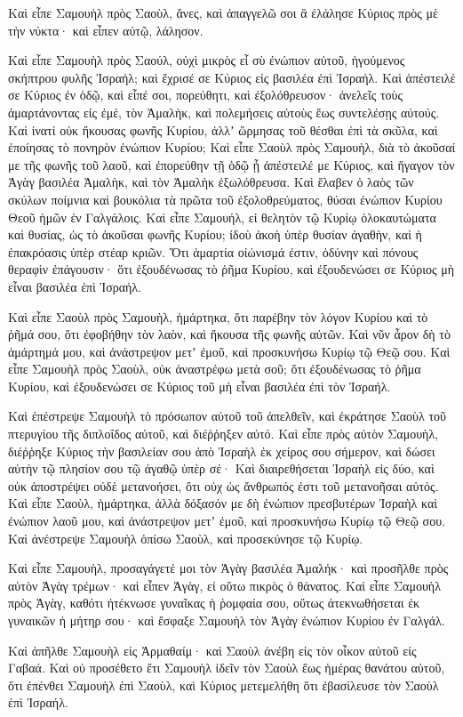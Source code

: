 {Καὶ εἶπε Σαμουὴλ πρὸς Σαοὺλ, ἄνες, καὶ ἀπαγγελῶ σοι ἃ ἐλάλησε Κύριος πρὸς μὲ τὴν νύκτα· καὶ εἶπεν αὐτῷ, λάλησον.
\par }{\PP {}Καὶ εἶπε Σαμουὴλ πρὸς Σαούλ, οὐχὶ μικρὸς εἶ σὺ ἐνώπιον αὐτοῦ, ἡγούμενος σκήπτρου φυλῆς Ἰσραήλ; καὶ ἔχρισέ σε Κύριος εἰς βασιλέα ἐπὶ Ἰσραήλ.
Καὶ ἀπέστειλέ σε Κύριος ἐν ὁδῷ, καὶ εἶπέ σοι, πορεύθητι, καὶ ἐξολόθρευσον· ἀνελεῖς τοὺς ἁμαρτάνοντας εἰς ἐμέ, τὸν Ἀμαλὴκ, καὶ πολεμήσεις αὐτοὺς ἕως συντελέσῃς αὐτούς.
Καὶ ἱνατί οὐκ ἤκουσας φωνῆς Κυρίου, ἀλλʼ ὥρμησας τοῦ θέσθαι ἐπὶ τὰ σκῦλα, καὶ ἐποίησας τὸ πονηρὸν ἐνώπιον Κυρίου;
Καὶ εἶπε Σαοὺλ πρὸς Σαμουὴλ, διὰ τὸ ἀκοῦσαί με τῆς φωνῆς τοῦ λαοῦ, καὶ ἐπορεύθην τῇ ὁδῷ ᾗ ἀπέστειλέ με Κύριος, καὶ ἤγαγον τὸν Ἀγὰγ βασιλέα Ἀμαλὴκ, καὶ τὸν Ἀμαλὴκ ἐξωλόθρευσα.
Καὶ ἔλαβεν ὁ λαὸς τῶν σκύλων ποίμνια καὶ βουκόλια τὰ πρῶτα τοῦ ἐξολοθρεύματος, θύσαι ἐνώπιον Κυρίου Θεοῦ ἡμῶν ἐν Γαλγάλοις.
Καὶ εἶπε Σαμουήλ, εἰ θελητὸν τῷ Κυρίῳ ὁλοκαυτώματα καὶ θυσίας, ὡς τὸ ἀκοῦσαι φωνῆς Κυρίου; ἰδοὺ ἀκοὴ ὑπὲρ θυσίαν ἀγαθὴν, καὶ ἡ ἐπακρόασις ὑπὲρ στέαρ κριῶν.
Ὅτι ἁμαρτία οἰώνισμά ἐστιν, ὀδύνην καὶ πόνους θεραφὶν ἐπάγουσιν· ὅτι ἐξουδένωσας τὸ ῥῆμα Κυρίου, καὶ ἐξουδενώσει σε Κύριος μὴ εἶναι βασιλέα ἐπὶ Ἰσραήλ.
\par }{\PP {}Καὶ εἶπε Σαοὺλ πρὸς Σαμουὴλ, ἡμάρτηκα, ὅτι παρέβην τὸν λόγον Κυρίου καὶ τὸ ῥῆμά σου, ὅτι ἐφοβήθην τὸν λαὸν, καὶ ἤκουσα τῆς φωνῆς αὐτῶν.
Καὶ νῦν ἆρον δὴ τὸ ἁμάρτημά μου, καὶ ἀνάστρεψον μετʼ ἐμοῦ, καὶ προσκυνήσω Κυρίῳ τῷ Θεῷ σου.
Καὶ εἶπε Σαμουὴλ πρὸς Σαοὺλ, οὐκ ἀναστρέφω μετὰ σοῦ; ὅτι ἐξουδένωσας τὸ ῥῆμα Κυρίου, καὶ ἐξουδενώσει σε Κύριος τοῦ μὴ εἶναι βασιλέα ἐπὶ τὸν Ἰσραήλ.
\par }{\PP {}Καὶ ἐπέστρεψε Σαμουὴλ τὸ πρόσωπον αὐτοῦ τοῦ ἀπελθεῖν, καὶ ἐκράτησε Σαοὺλ τοῦ πτερυγίου τῆς διπλοΐδος αὐτοῦ, καὶ διέῤῥηξεν αὐτό.
Καὶ εἶπε πρὸς αὐτὸν Σαμουὴλ, διέῤῥηξε Κύριος τὴν βασιλείαν σου ἀπὸ Ἰσραὴλ ἐκ χείρος σου σήμερον, καὶ δώσει αὐτὴν τῷ πλησίον σου τῷ ἀγαθῷ ὑπὲρ σέ·
Καὶ διαιρεθήσεται Ἰσραὴλ εἰς δύο, καὶ οὐκ ἀποστρέψει οὐδὲ μετανοήσει, ὅτι οὐχ ὡς ἄνθρωπός ἐστι τοῦ μετανοῆσαι αὐτός.
Καὶ εἶπε Σαοὺλ, ἡμάρτηκα, ἀλλὰ δόξασόν με δὴ ἐνώπιον πρεσβυτέρων Ἰσραὴλ καὶ ἐνώπιον λαοῦ μου, καὶ ἀνάστρεψον μετʼ ἐμοῦ, καὶ προσκυνήσω Κυρίῳ τῷ Θεῷ σου.
Καὶ ἀνέστρεψε Σαμουὴλ ὀπίσω Σαοὺλ, καὶ προσεκύνησε τῷ Κυρίῳ.
\par }{\PP {}Καὶ εἶπε Σαμουὴλ, προσαγάγετέ μοι τὸν Ἀγὰγ βασιλέα Ἀμαλήκ· καὶ προσῆλθε πρὸς αὐτὸν Ἀγὰγ τρέμων· καὶ εἶπεν Ἀγὰγ, εἰ οὕτω πικρὸς ὁ θάνατος.
Καὶ εἶπε Σαμουὴλ πρὸς Ἀγὰγ, καθότι ἠτέκνωσε γυναῖκας ἡ ῥομφαία σου, οὕτως ἀτεκνωθήσεται ἐκ γυναικῶν ἡ μήτηρ σου· καὶ ἔσφαξε Σαμουὴλ τὸν Ἀγὰγ ἐνώπιον Κυρίου ἐν Γαλγάλ.
\par }{\PP {}Καὶ ἀπῆλθε Σαμουὴλ εἰς Ἀρμαθαίμ· καὶ Σαοὺλ ἀνέβη εἰς τὸν οἶκον αὐτοῦ εἰς Γαβαά.
Καὶ οὐ προσέθετο ἔτι Σαμουὴλ ἰδεῖν τὸν Σαοὺλ ἕως ἡμέρας θανάτου αὐτοῦ, ὅτι ἐπένθει Σαμουὴλ ἐπὶ Σαοὺλ, καὶ Κύριος μετεμελήθη ὅτι ἐβασίλευσε τὸν Σαοὺλ ἐπὶ Ἰσραήλ.

}
